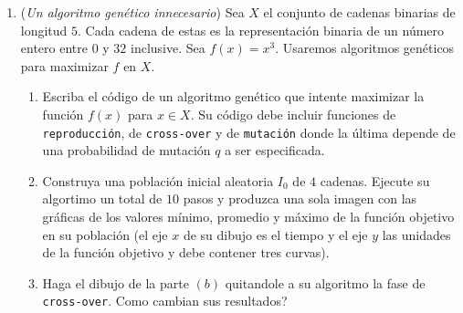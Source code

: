 \documentclass[12pt, a4paper]{article}
\begin{document}
\begin{enumerate}
\item ({\it Un algoritmo genético innecesario}) Sea $X$ el conjunto de cadenas binarias de longitud $5$. Cada cadena de estas es la representación binaria de un número entero entre $0$ y $32$ inclusive. Sea $f(x)=x^3$. Usaremos algoritmos genéticos para maximizar $f$ en $X$.
\begin{enumerate}
\item Escriba el código de un algoritmo genético que intente maximizar la función $f(x)$ para $x\in X$. Su código debe incluir funciones de \verb!reproducción!, de \verb!cross-over! y de \verb!mutación! donde la última depende de una probabilidad de mutación $q$ a ser especificada. 

\item Construya una población inicial aleatoria $I_0$ de $4$ cadenas. Ejecute su algortimo un total de $10$ pasos y produzca una sola imagen con las gráficas de los valores mínimo, promedio y máximo de la función objetivo en su población (el eje $x$ de su dibujo es el tiempo y el eje $y$ las unidades de la función objetivo y debe contener tres curvas).

\item Haga el dibujo de la parte $(b)$ quitandole a su algoritmo la fase de \verb!cross-over!. Como cambian sus resultados?

\end{enumerate}
 
\end{enumerate}
\end{document}
